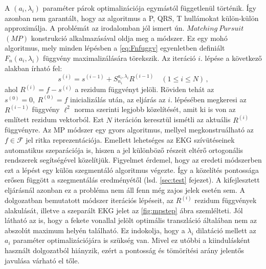 \documentclass[oneside,titlepage,12pt,a4paper]{report}
\begin{document}
A $(a_i,\lambda_i)$ paraméter párok optimalizációja egymástól függetlenül történik. Így azonban nem garantált, hogy az algoritmus a P, QRS, T hullámokat külön-külön approximálja. A problémát az irodalomban jól ismert ún. $Matching\ Pursuit$ $(MP)$ konstrukció \cite{mpurs} alkalmazásával oldja meg a módszer. Ez egy mohó algoritmus, mely minden lépésben a \eqref{eq:Fnfuggv} egyenletben definiált $F_n(a_i,\lambda_i)$ függvény maximalizálására törekszik. Az iteráció $i.$ lépése a következő alakban írható fel:
\begin{equation}
	s^{(i)}=s^{(i-1)} + S^{a_i,\lambda_i}_{n_i} R^{(i-1)} \quad (1\leq i \leq N)\,,
\label{eq:mpurs}
\end{equation}
ahol $R^{(i)}=f-s^{(i)}$ a rezidum függvényt jelöli. Röviden tehát az $s^{(0)}=0,\ R^{(0)}=f$ inicializálás után, az eljárás az $i.$ lépésében megkeresi az $R^{(i-1)}$ függvény $\ell^2$ norma szerinti legjobb közelítését, amit ki is von az említett rezidum vektorból. Ezt $N$ iteráción keresztül ismétli az aktuális $R^{(i)}$ függvényre. Az MP módszer egy gyors algoritmus, mellyel megkonstruálható az $f\in\mathcal{F}$ jel ritka reprezentációja. Emellett lehetséges az EKG szívütéseinek automatikus szeparációja is, hiszen a jel különböző részeit eltérő ortogonális rendszerek segítségével közelítjük. Figyelmet érdemel, hogy az eredeti \cite{hexp3} módszerben ezt a lépést egy külön szegmentáló algoritmus végezte. Így a közelítés pontossága erősen függött a szegmentálás eredményétől (lsd. \ref{sec:test} fejezet). A kifejlesztett eljárásnál azonban ez a probléma nem áll fenn még zajos jelek esetén sem. A dolgozatban bemutatott módszer iterációs lépéseit, az $R^{(i)}$ rezidum függvények alakulását, illetve a szeparált EKG jelet az \ref{fig:mpstep} ábra szemlélteti. Jól látható az is, hogy a fekete vonallal jelölt optimális transzláció általában nem az abszolút maximum helyén található. Ez indokolja, hogy a $\lambda_i$ dilatáció mellett az $a_i$ paraméter optimalizációjára is szükség van. Mivel ez utóbbi a kiindulásként használt \cite{hexp3} dolgozatból hiányzik, ezért a pontosság és tömörítési arány jelentős javulása várható el tőle.
\end{document}
